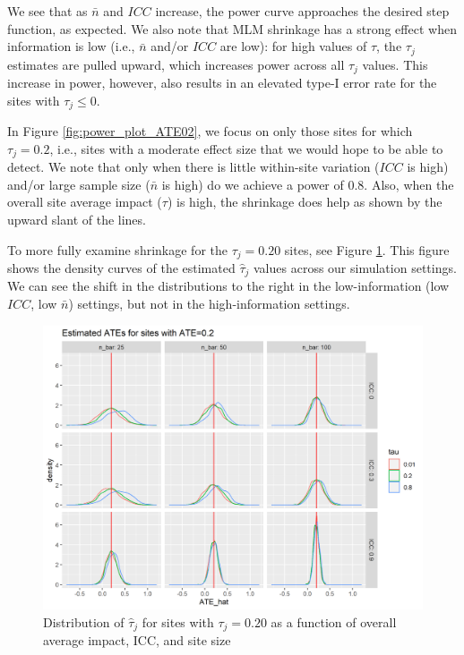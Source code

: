 \documentclass[]{article}
\begin{document}
We see that as $\bar{n}$ and $ICC$ increase, the power curve approaches the desired step function, as expected.
We also note that MLM shrinkage has a strong effect when information is low (i.e., $\bar{n}$ and/or $ICC$ are low): for high values of $\tau$, the $\tau_j$ estimates are pulled upward, which increases power across all $\tau_j$ values.
This increase in power, however, also results in an elevated type-I error rate for the sites with $\tau_j \leq 0$.


In Figure \ref{fig:power_plot_ATE02}, we focus on only those sites for which $\tau_j = 0.2$, i.e., sites with a moderate effect size that we would hope to be able to detect.
We note that only when there is little within-site variation ($ICC$ is high) and/or large sample size ($\bar{n}$ is high) do we achieve a power of 0.8.
Also, when the overall site average impact ($\tau$) is high, the shrinkage does help as shown by the upward slant of the lines.

To more fully examine shrinkage for the $\tau_j = 0.20$ sites, see Figure \ref{fig:power_plot_ATE02_dens}.
This figure shows the density curves of the estimated $\hat{\tau}_j$ values across our simulation settings.
We can see the shift in the distributions to the right in the low-information (low $ICC$, low $\bar{n}$) settings, but not in the high-information settings.

\begin{figure}[ht]
	\centering
	\includegraphics[width=\textwidth]{power_plot_ATE02_dens}
	\caption{Distribution of $\hat{\tau}_j$ for sites with $\tau_j = 0.20$ as a function of overall average impact, ICC, and site size}
	\label{fig:power_plot_ATE02_dens}
\end{figure}
\end{document}
